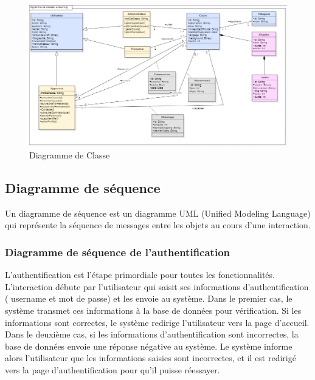 \begin{figure}[H]
    \centering
    \includegraphics[width=19cm]{Figures/diagramme de classe.PNG}
    \caption{Diagramme de Classe}
\end{figure}

\subsection{Diagramme de séquence}

Un diagramme de séquence est un diagramme UML (Unified Modeling Language) qui représente la séquence de messages entre les objets au cours d'une interaction.

\subsubsection{Diagramme de séquence de l’authentification}

L’authentification est l’étape primordiale pour toutes les fonctionnalités. L'interaction débute par l’utilisateur qui saisit ses informations d'authentification ( username et mot de passe) et les envoie au système.
Dans le premier cas, le système transmet ces informations à la base de données pour vérification. Si les informations sont correctes, le système redirige l'utilisateur vers la page d'accueil.
Dans le deuxième cas, si les informations d'authentification sont incorrectes, la base de données envoie une réponse négative au système. Le système informe alors l'utilisateur que les informations saisies sont incorrectes, et il est redirigé vers la page d'authentification pour qu'il puisse réessayer.


